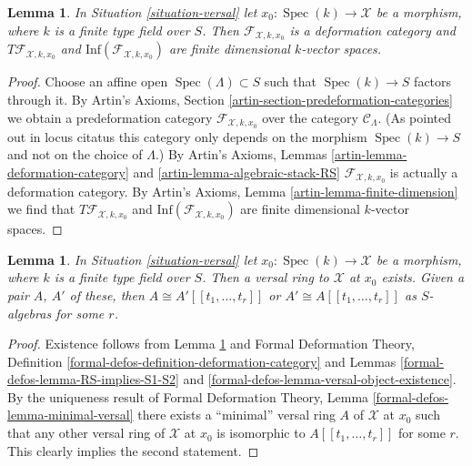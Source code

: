 \documentclass{stacks-project}
\theoremstyle{plain}
\newtheorem{lemma}[subsection]{Lemma}
\theoremstyle{definition}
\theoremstyle{remark}
\numberwithin{equation}{subsection}
\def\Spec{\mathop{\mathrm{Spec}}}
\begin{document}
\begin{lemma}
\label{lemma-deformation-category}
In Situation \ref{situation-versal} let $x_0 : \Spec(k) \to \mathcal{X}$
be a morphism, where $k$ is a finite type field over $S$.
Then $\mathcal{F}_{\mathcal{X}, k, x_0}$
is a deformation category and $T\mathcal{F}_{\mathcal{X}, k, x_0}$
and $\text{Inf}(\mathcal{F}_{\mathcal{X}, k, x_0})$
are finite dimensional $k$-vector spaces.
\end{lemma}

\begin{proof}
Choose an affine open $\Spec(\Lambda) \subset S$ such that
$\Spec(k) \to S$ factors through it.
By Artin's Axioms, Section \ref{artin-section-predeformation-categories}
we obtain a predeformation category
$\mathcal{F}_{\mathcal{X}, k, x_0}$
over the category $\mathcal{C}_\Lambda$.
(As pointed out in locus citatus this category only depends
on the morphism $\Spec(k) \to S$ and not on the choice of
$\Lambda$.) By Artin's Axioms, Lemmas
\ref{artin-lemma-deformation-category} and
\ref{artin-lemma-algebraic-stack-RS}
$\mathcal{F}_{\mathcal{X}, k, x_0}$ is actually a deformation category.
By Artin's Axioms, Lemma \ref{artin-lemma-finite-dimension}
we find that $T\mathcal{F}_{\mathcal{X}, k, x_0}$
and $\text{Inf}(\mathcal{F}_{\mathcal{X}, k, x_0})$
are finite dimensional $k$-vector spaces.
\end{proof}

\begin{lemma}
\label{lemma-versal-ring}
In Situation \ref{situation-versal} let $x_0 : \Spec(k) \to \mathcal{X}$
be a morphism, where $k$ is a finite type field over $S$.
Then a versal ring to $\mathcal{X}$ at $x_0$ exists. Given a pair
$A$, $A'$ of these, then $A \cong A'[[t_1, \ldots, t_r]]$
or $A' \cong A[[t_1, \ldots, t_r]]$ as $S$-algebras
for some $r$.
\end{lemma}

\begin{proof}
Existence follows from Lemma \ref{lemma-deformation-category} and
Formal Deformation Theory,
Definition \ref{formal-defos-definition-deformation-category} and
Lemmas \ref{formal-defos-lemma-RS-implies-S1-S2} and
\ref{formal-defos-lemma-versal-object-existence}.
By the uniqueness result of
Formal Deformation Theory, Lemma \ref{formal-defos-lemma-minimal-versal}
there exists a ``minimal'' versal ring $A$ of $\mathcal{X}$ at $x_0$
such that any other versal ring of $\mathcal{X}$ at $x_0$ is
isomorphic to $A[[t_1, \ldots, t_r]]$ for some $r$.
This clearly implies the second statement.
\end{proof}
\end{document}
